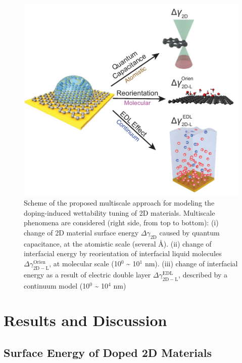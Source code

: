\documentclass[journal=langd5,manuscript=article,email=true,hyperref=true,keywords=true]{achemso}
\begin{document}
\begin{figure}[htbp]
\centering
\includegraphics[width=0.95\linewidth]{../img/scheme-methods.pdf}
\caption{\label{fig:scheme-method} Scheme of the proposed multiscale
  approach for modeling the doping-induced wettability tuning of 2D
  materials. Multiscale phenomena are considered (right side, from top
  to bottom): (i) change of 2D material surface energy
  \(\Delta \gamma_{\mathrm{2D}}\) caused by quantum capacitance, at
  the atomistic scale (several \AA{}). (ii) change of interfacial
  energy by reorientation of interfacial liquid molecules
  \(\Delta \gamma_{\mathrm{2D-L}} ^{\mathrm{Orien}}\), at molecular
  scale (10\(^{\text{0}}\) \textasciitilde{} 10\(^{\text{1}}\)
  nm). (iii) change of interfacial energy as a result of electric
  double layer \(\Delta \gamma_{\mathrm{2D-L}} ^{\mathrm{EDL}}\),
  described by a continuum model (10\(^{\text{0}}\) \textasciitilde{}
  10\(^{\text{4}}\) nm)}
\end{figure}

\section{Results and Discussion}
\label{sec:orga11172d}

\subsection{Surface Energy of Doped 2D Materials}
\label{sec:org8df08f3}
\end{document}
